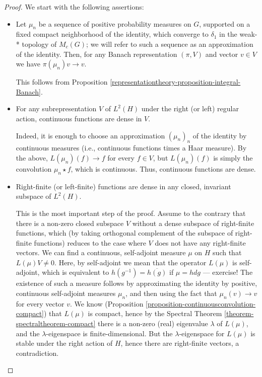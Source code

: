 \begin{proof}
We start with the following assertions:  

\begin{itemize}
 \item Let $\mu_n$ be a sequence of positive probability measures on $G$, supported on a fixed compact neighborhood of the identity,  which converge to $\delta_1$ in the weak-* topology of $M_c(G)$; we will refer to such a sequence as an approximation of the identity. Then, for any Banach representation $(\pi,V)$ and vector $v\in V$ we have $\pi(\mu_n)v\to v$.
 
 This follows from Proposition \ref{representationtheory-proposition-integral-Banach}.
 
 
 \item For any subrepresentation $V$ of $L^2(H)$ under the right (or left) regular action, continuous functions are dense in $V$. 

Indeed, it is enough to choose an approximation $(\mu_n)_n$ of the identity by continuous measures (i.e., continuous functions times a Haar measure). By the above, $L(\mu_n)(f)\to f$ for every $f\in V$, but $L(\mu_n)(f)$ is simply the convolution $\mu_n\star f$, which is continuous. Thus, continuous functions are dense. 

\item Right-finite (or left-finite) functions are dense in any closed, invariant subspace of $L^2(H)$. 

This is the most important step of the proof. Assume to the contrary that there is a non-zero closed subspace $V$ without a dense subspace of right-finite functions, which (by taking orthogonal complement of the subspace of right-finite functions) reduces to the case where $V$ does not have any right-finite vectors. We can find a continuous, self-adjoint measure $\mu$ on $H$ such that $L(\mu)V\ne 0$. Here, by self-adjoint we mean that the operator $L(\mu)$ is self-adjoint, which is equivalent to $h(g^{-1})=\overline{h(g)}$ if $\mu=hdg$ --- exercise! The existence of such a measure follows by approximating the identity by positive, continuous self-adjoint measures $\mu_n$, and then using the fact that $\mu_n(v)\to v$ for every vector $v$.  We know (Proposition \ref{proposition-continuousconvolution-compact}) that $L(\mu)$ is compact, hence by the Spectral Theorem \ref{theorem-spectraltheorem-compact} there is a non-zero (real) eigenvalue $\lambda$ of $L(\mu)$, and the $\lambda$-eigenspace is finite-dimensional. But the $\lambda$-eigenspace for $L(\mu)$ is stable under the right action of $H$, hence there are right-finite vectors, a contradiction.


\end{itemize}
\end{proof}
